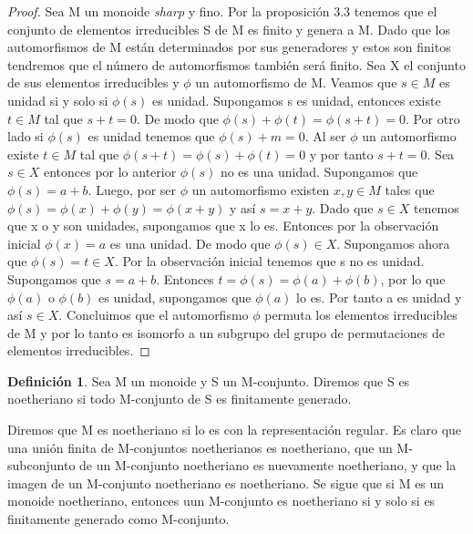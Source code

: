 \documentclass[12pt,spanish]{amsart}
\theoremstyle{definition}
\newtheorem{Def}[Theorem]{Definición}
\theoremstyle{remark}
\begin{document}
\begin{proof}
Sea M un monoide \textit{sharp} y fino. Por la proposición 3.3 tenemos que el conjunto de elementos irreducibles S de M es finito y genera a M. Dado que los automorfismos de M están determinados por sus generadores y estos son finitos tendremos que el número de automorfismos también será finito. Sea X el conjunto de sus elementos irreducibles y $\phi$ un automorfismo de M. Veamos que $s\in M$ es unidad si y solo si $\phi(s)$ es unidad. Supongamos s es unidad, entonces existe $t\in M$ tal que $s+t=0$. De modo que $\phi(s)+\phi(t)=\phi(s+t)=0$. Por otro lado si $\phi(s)$ es unidad tenemos que $\phi(s)+m=0$. Al ser $\phi$ un automorfismo existe $t\in M$ tal que $\phi(s+t)=\phi(s)+\phi(t)=0$ y por tanto $s+t=0$. Sea $s\in X$ entonces por lo anterior $\phi(s)$ no es una unidad. Supongamos que $\phi(s)=a+b$. Luego, por ser $\phi$ un automorfismo existen $x,y\in M$ tales que $\phi(s)=\phi(x)+\phi(y)=\phi(x+y)$ y así $s=x+y$. Dado que $s\in X$ tenemos que x o y son unidades, supongamos que x lo es. Entonces por la observación inicial $\phi(x)=a$ es una unidad. De modo que $\phi(s)\in X$. Supongamos ahora que $\phi(s)=t\in X$. Por la observación inicial tenemos que s no es unidad. Supongamos que $s=a+b$. Entonces $t=\phi(s)=\phi(a)+\phi(b)$, por lo que $\phi(a)$ o $\phi(b)$ es unidad, supongamos que $\phi(a)$ lo es. Por tanto a es unidad y así $s\in X$. Concluimos que el automorfismo $\phi$ permuta los elementos irreducibles de M y por lo tanto es isomorfo a un subgrupo del grupo de permutaciones de elementos irreducibles. 

\end{proof}

\begin{Def}
Sea M un monoide y S un M-conjunto. Diremos que S es noetheriano si todo M-conjunto de S es finitamente generado.  
\end{Def}

Diremos que M es noetheriano si lo es con la representación regular. Es claro que una unión finita de M-conjuntos noetherianos es noetheriano, que un M-subconjunto de un M-conjunto noetheriano es nuevamente noetheriano, y que la imagen de un M-conjunto noetheriano es noetheriano. Se sigue que si M es un monoide noetheriano, entonces uun M-conjunto es noetheriano si y solo si es finitamente generado como M-conjunto. 
\end{document}
